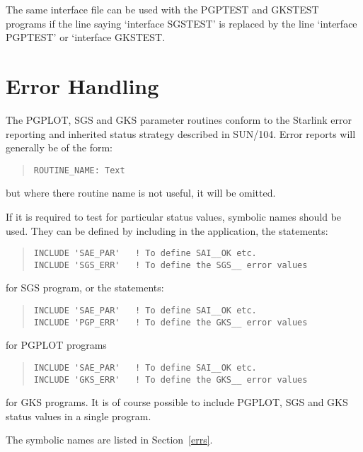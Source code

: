 \documentclass[twoside,11pt]{article}
\newcommand{\hyperref}[4]{#2\ref{#4}#3}
\newcommand{\xref}[3]{#1}
\renewcommand{\_}{\texttt{\symbol{95}}}
\begin{document}
The same interface file can be used with the PGPTEST and GKSTEST programs if
the line saying `interface SGSTEST' is replaced by the line `interface
PGPTEST' or `interface GKSTEST.

\section{Error Handling}
\label{errhnd}
The PGPLOT, SGS and GKS parameter routines conform to the Starlink error 
reporting and inherited status strategy described in \xref{SUN/104}{sun104}{}.
Error reports will generally be of the form:
\begin{quote}
\begin{verbatim}
ROUTINE_NAME: Text
\end{verbatim}
\end{quote}
but where there routine name is not useful, it will be omitted.

If it is required to test for particular status values, symbolic names should
be used. They can be defined by including in the application, the statements:

\begin{quote}
\begin{verbatim}
INCLUDE 'SAE_PAR'   ! To define SAI__OK etc.
INCLUDE 'SGS_ERR'   ! To define the SGS__ error values
\end{verbatim}
\end{quote}

for SGS program, or the statements:

\begin{quote}
\begin{verbatim}
INCLUDE 'SAE_PAR'   ! To define SAI__OK etc.
INCLUDE 'PGP_ERR'   ! To define the GKS__ error values
\end{verbatim}
\end{quote}

for PGPLOT programs\begin{quote}

\begin{verbatim}
INCLUDE 'SAE_PAR'   ! To define SAI__OK etc.
INCLUDE 'GKS_ERR'   ! To define the GKS__ error values
\end{verbatim}
\end{quote}

for GKS programs. It is of course possible to include PGPLOT, SGS and GKS
status values in a single program.

The symbolic names are listed in \hyperref{here}{Section~}{}{errs}.
\end{document}
